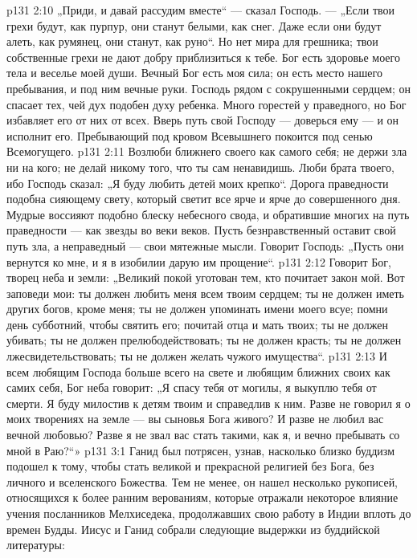 \vs p131 2:10 „Приди, и давай рассудим вместе“ --- сказал Господь. --- „Если твои грехи будут, как пурпур, они станут белыми, как снег. Даже если они будут алеть, как румянец, они станут, как руно“. Но нет мира для грешника; твои собственные грехи не дают добру приблизиться к тебе. Бог есть здоровье моего тела и веселье моей души. Вечный Бог есть моя сила; он есть место нашего пребывания, и под ним вечные руки. Господь рядом с сокрушенными сердцем; он спасает тех, чей дух подобен духу ребенка. Много горестей у праведного, но Бог избавляет его от них от всех. Вверь путь свой Господу --- доверься ему --- и он исполнит его. Пребывающий под кровом Всевышнего покоится под сенью Всемогущего.
\vs p131 2:11 Возлюби ближнего своего как самого себя; не держи зла ни на кого; не делай никому того, что ты сам ненавидишь. Люби брата твоего, ибо Господь сказал: „Я буду любить детей моих крепко“. Дорога праведности подобна сияющему свету, который светит все ярче и ярче до совершенного дня. Мудрые воссияют подобно блеску небесного свода, и обратившие многих на путь праведности --- как звезды во веки веков. Пусть безнравственный оставит свой путь зла, а неправедный --- свои мятежные мысли. Говорит Господь: „Пусть они вернутся ко мне, и я в изобилии дарую им прощение“.
\vs p131 2:12 Говорит Бог, творец неба и земли: „Великий покой уготован тем, кто почитает закон мой. Вот заповеди мои: ты должен любить меня всем твоим сердцем; ты не должен иметь других богов, кроме меня; ты не должен упоминать имени моего всуе; помни день субботний, чтобы святить его; почитай отца и мать твоих; ты не должен убивать; ты не должен прелюбодействовать; ты не должен красть; ты не должен лжесвидетельствовать; ты не должен желать чужого имущества“.
\vs p131 2:13 И всем любящим Господа больше всего на свете и любящим ближних своих как самих себя, Бог неба говорит: „Я спасу тебя от могилы, я выкуплю тебя от смерти. Я буду милостив к детям твоим и справедлив к ним. Разве не говорил я о моих творениях на земле --- вы сыновья Бога живого? И разве не любил вас вечной любовью? Разве я не звал вас стать такими, как я, и вечно пребывать со мной в Раю?“»
\vs p131 3:1 Ганид был потрясен, узнав, насколько близко буддизм подошел к тому, чтобы стать великой и прекрасной религией без Бога, без личного и вселенского Божества. Тем не менее, он нашел несколько рукописей, относящихся к более ранним верованиям, которые отражали некоторое влияние учения посланников Мелхиседека, продолжавших свою работу в Индии вплоть до времен Будды. Иисус и Ганид собрали следующие выдержки из буддийской литературы:
